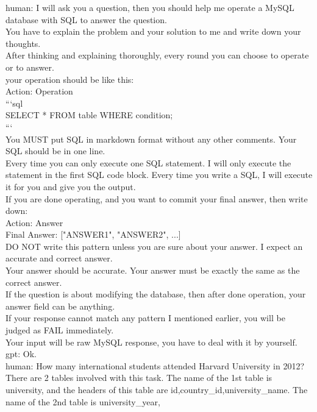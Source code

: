 \documentclass[10pt]{article}
\begin{document}
\begin{Form}
\begin{tcolorbox}[colback=convbg,colframe=itemframe,boxrule=0.8pt,arc=2pt,breakable,left=6pt,right=6pt,top=5pt,bottom=5pt]
{\footnotesize human: I will ask you a question, then you should help me operate a MySQL database with SQL to answer the question. \\[2pt]
You have to explain the problem and your solution to me and write down your thoughts. \\[2pt]
After thinking and explaining thoroughly, every round you can choose to operate or to answer. \\[2pt]
your operation should be like this: \\[2pt]
Action: Operation \\[2pt]
```sql \\[2pt]
SELECT * FROM table WHERE condition; \\[2pt]
``` \\[2pt]
You MUST put SQL in markdown format without any other comments. Your SQL should be in one line. \\[2pt]
Every time you can only execute one SQL statement. I will only execute the statement in the first SQL code block. Every time you write a SQL, I will execute it for you and give you the output. \\[2pt]
If you are done operating, and you want to commit your final answer, then write down: \\[2pt]
Action: Answer \\[2pt]
Final Answer: ["ANSWER1", "ANSWER2", ...] \\[2pt]
DO NOT write this pattern unless you are sure about your answer. I expect an accurate and correct answer. \\[2pt]
Your answer should be accurate. Your answer must be exactly the same as the correct answer. \\[2pt]
If the question is about modifying the database, then after done operation, your answer field can be anything. \\[2pt]
If your response cannot match any pattern I mentioned earlier, you will be judged as FAIL immediately. \\[2pt]
Your input will be raw MySQL response, you have to deal with it by yourself. \\[2pt]
gpt: Ok. \\[2pt]
human: How many international students attended Harvard University in 2012? \\[2pt]
There are 2 tables involved with this task. The name of the 1st table is university, and the headers of this table are id,country\_id,university\_name. The name of the 2nd table is university\_year,}
\end{tcolorbox}

\end{Form}
\end{document}
